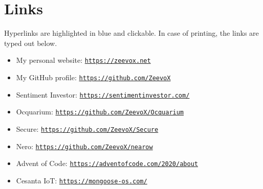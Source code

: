 \documentclass[11pt,twoside,a4paper]{book}
\begin{document}
\pagebreak

\section*{Links}

Hyperlinks are highlighted in blue and clickable. In case of printing, the links are typed out below.

\begin{itemize}
  \item My personal website: \texttt{\href{https://zeevox.net}{https://zeevox.net}}
    \item My GitHub profile: \texttt{\href{https://github.com/ZeevoX}{https://github.com/ZeevoX}}
    \item Sentiment Investor: \href{https://sentimentinvestor.com/}{\texttt{https://sentimentinvestor.com/}}
    \item Ocquarium: \texttt{\href{https://github.com/ZeevoX/Ocquarium}{https://github.com/ZeevoX/Ocquarium}}
    \item Secure: \texttt{\href{https://github.com/ZeevoX/Secure}{https://github.com/ZeevoX/Secure}}
    \item Nero: \texttt{\href{https://github.com/ZeevoX/nearow}{https://github.com/ZeevoX/nearow}}
    \item Advent of Code: \texttt{\href{https://adventofcode.com/2020/about}{https://adventofcode.com/2020/about}}
    \item Cesanta IoT: \texttt{\href{https://mongoose-os.com/}{https://mongoose-os.com/}}
\end{itemize}
\end{document}
